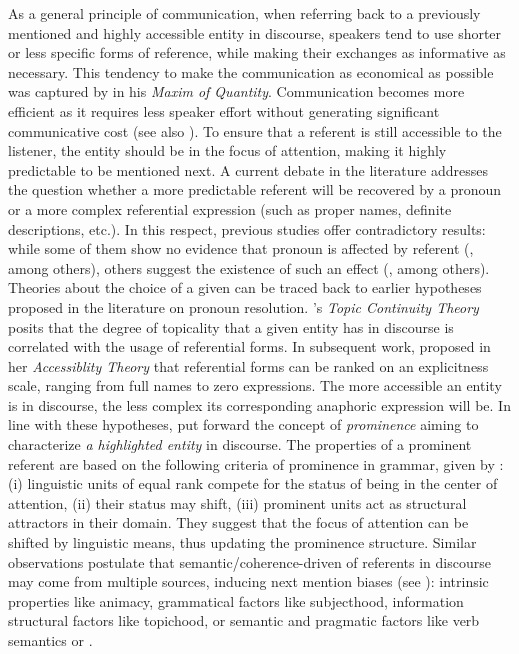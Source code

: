 \documentclass[output=paper,colorlinks,citecolor=brown]{langscibook}
\begin{document}
As a general principle of communication, when referring back to a previously mentioned and highly accessible entity in discourse, speakers tend to use shorter or less specific forms of reference, while making their exchanges as informative as necessary. This tendency to make the communication as economical as possible was captured by \citet{grice1975logic} in his \textit{Maxim of Quantity}. Communication becomes more efficient as it requires less speaker effort without generating significant communicative cost (see also \citealt{ jaeger2006speakers}). To ensure that a referent is still accessible to the listener, the entity should be in the focus of attention, making it highly predictable to be mentioned next. A current debate in the literature addresses the question whether a more predictable referent will be recovered by a pronoun or a more complex referential expression (such as proper names, definite descriptions, etc.). In this respect, previous studies offer contradictory results: while some of them show no evidence  that pronoun  is affected by referent  (\citealt{ferretti2009verb, fukumura2010choosing, kehler2013probabilistic, rosa2015semantic, patterson2022bayesian}, among others), others suggest the existence of such an effect (\citealt{arnold2001effect, rosa2017predictability, lindemann2020thematic}, among others).
Theories about the choice of a given  can be traced back to earlier hypotheses proposed in the literature on pronoun resolution. \citet{givon1983topic}’s \textit{Topic Continuity Theory} posits that the degree of topicality that a given entity has in discourse is correlated with the usage of referential forms. In subsequent work, \citet{ariel1994interpreting} proposed in her \textit{Accessiblity Theory} that referential forms can be ranked on an explicitness scale, ranging from full names to zero expressions. The more accessible an entity is in discourse, the less complex its corresponding anaphoric expression will be. In line with these hypotheses, \citet{von2019discourse} put forward the concept of \textit{prominence} aiming to characterize \textit{a highlighted entity} in discourse. The properties of a prominent referent are based on the following criteria of prominence in grammar, given by \citet{himmelmann2015prominence}: (i) linguistic units of equal rank compete for the status of being in the center of attention, (ii) their status may shift, (iii) prominent units act as structural attractors in their domain. They suggest that the focus of attention can be shifted by linguistic means, thus updating the prominence structure. Similar observations postulate that semantic/coherence-driven  of referents in discourse may come from multiple sources, inducing next mention biases (see \citealt{gernsbacher1988accessing,gordon1993pronouns,grosz1995centering,fukumura2011effect}): intrinsic properties like animacy, grammatical factors like subjecthood, information structural factors like topichood, or semantic and pragmatic factors like verb semantics or .
\end{document}

